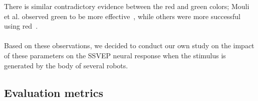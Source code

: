 \documentclass[smallextended]{svjour3}
\begin{document}
There is similar contradictory evidence between the red and green colors; Mouli et al. observed green to be more effective~\cite{mouli2013performance}, while others were more successful using red~\cite{cao2012flashing}.\\
\\
Based on these observations, we decided to conduct our own study on the impact of these parameters on the SSVEP neural response when the stimulus is generated by the body of several robots. 
\\
\subsection{Evaluation metrics}
\end{document}
